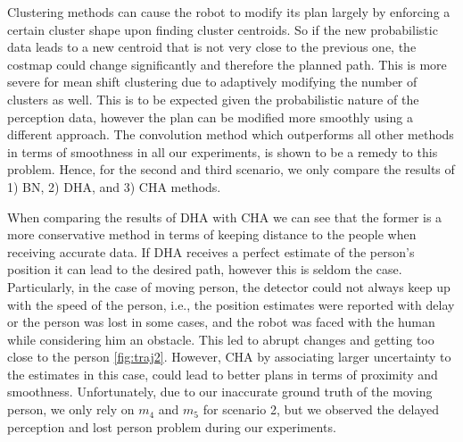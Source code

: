 Clustering methods can cause the robot to modify its plan largely by enforcing a certain cluster shape upon finding cluster centroids. So if the new probabilistic data leads to a new centroid that is not very close to the previous one, the costmap could change significantly and therefore the planned path. This is more severe for mean shift clustering due to adaptively modifying the number of clusters as well. This is to be expected given the probabilistic nature of the perception data, however the plan can be modified more smoothly using a different approach. The convolution method which outperforms all other methods in terms of smoothness in all our experiments, is shown to be a remedy to this problem. Hence, for the second and third scenario, we only compare the results of 1) BN, 2) DHA, and 3) CHA methods.  

When comparing the results of DHA with CHA we can see that the former is a more conservative method in terms of keeping distance to the people when receiving accurate data. If DHA receives a perfect estimate of the person's position it can lead to the desired path, however this is seldom the case. Particularly, in the case of moving person, the detector could not always keep up with the speed of the person, i.e., the position estimates were reported with delay or the person was lost in some cases, and the robot was faced with the human while considering him an obstacle. This led to abrupt changes and getting too close to the person \ref{fig:traj2}. However, CHA by associating larger uncertainty to the estimates in this case, could lead to better plans in terms of proximity and smoothness. Unfortunately, due to our inaccurate ground truth of the moving person, we only rely on $m_{4}$ and $m_{5}$ for scenario 2, but we observed the delayed perception and lost person problem during our experiments. 

